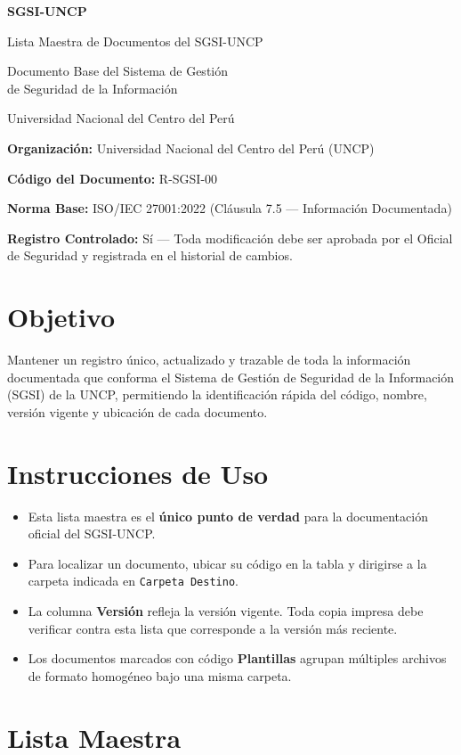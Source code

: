 \documentclass[10pt,letterpaper]{article}
\newcommand{\makecover}{
\begin{titlepage}
\centering
\vspace*{2cm}
{\Huge\bfseries\color{uncpblue} SGSI-UNCP\par}
\vspace{0.7cm}
{\LARGE Lista Maestra de Documentos del SGSI-UNCP\par}
\vspace{0.5cm}
{\large Documento Base del Sistema de Gestión\\de Seguridad de la Información\par}
\vspace{1.5cm}
{\small Universidad Nacional del Centro del Perú\par}
\vfill
\end{titlepage}
}
\begin{document}
\makecover
\setcounter{tocdepth}{2}
\RaggedRight
\tableofcontents
\newpage

\RaggedRight
\textbf{Organización:} Universidad Nacional del Centro del Perú (UNCP)

\textbf{Código del Documento:} R-SGSI-00

\textbf{Norma Base:} ISO/IEC 27001:2022 (Cláusula 7.5 --- Información
Documentada)

\textbf{Registro Controlado:} Sí --- Toda modificación debe ser aprobada
por el Oficial de Seguridad y registrada en el historial de cambios.

\section{Objetivo}\label{objetivo}

Mantener un registro único, actualizado y trazable de toda la
información documentada que conforma el Sistema de Gestión de Seguridad
de la Información (SGSI) de la UNCP, permitiendo la identificación
rápida del código, nombre, versión vigente y ubicación de cada
documento.

\section{Instrucciones de Uso}\label{instrucciones-de-uso}

\begin{itemize}
\tightlist
\item
  Esta lista maestra es el \textbf{único punto de verdad} para la
  documentación oficial del SGSI-UNCP.
\item
  Para localizar un documento, ubicar su código en la tabla y dirigirse
  a la carpeta indicada en \texttt{Carpeta\ Destino}.
\item
  La columna \textbf{Versión} refleja la versión vigente. Toda copia
  impresa debe verificar contra esta lista que corresponde a la versión
  más reciente.
\item
  Los documentos marcados con código \textbf{Plantillas} agrupan
  múltiples archivos de formato homogéneo bajo una misma carpeta.
\end{itemize}

\section{Lista Maestra}\label{lista-maestra}
\end{document}
